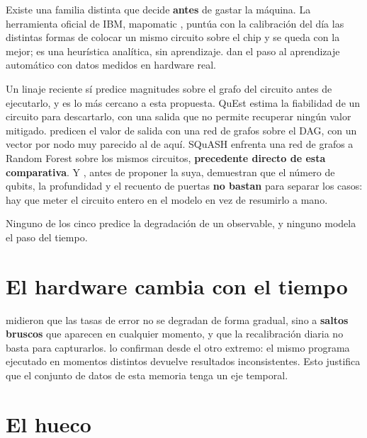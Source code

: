 Existe una familia distinta que decide \textbf{antes} de gastar la máquina. La herramienta
oficial de IBM, mapomatic \cite{nation2023suppressing}, puntúa con la calibración del día las
distintas formas de colocar un mismo circuito sobre el chip y se queda con la mejor; es una
heurística analítica, sin aprendizaje.  dan el paso al aprendizaje
automático con datos medidos en hardware real.

Un linaje reciente sí predice magnitudes sobre el grafo del circuito antes de ejecutarlo, y es
lo más cercano a esta propuesta. QuEst \cite{wang2025quest} estima la fiabilidad
de un circuito para descartarlo, con una salida que no permite recuperar ningún valor mitigado.
 predicen el valor de salida con una red de grafos sobre el DAG, con un
vector por nodo muy parecido al de aquí. 
SQuASH \cite{martyniuk2025benchmarking} enfrenta una red de grafos a Random Forest sobre los
mismos circuitos, \textbf{precedente directo de esta comparativa}. Y , antes de
proponer la suya, demuestran que el número de qubits, la profundidad y el recuento de puertas
\textbf{no bastan} para separar los casos: hay que meter el circuito entero en el modelo en vez
de resumirlo a mano.

Ninguno de los cinco predice la degradación de un observable, y ninguno modela el
paso del tiempo.

\section{El hardware cambia con el tiempo}
\label{sec:drift}

 midieron que las tasas de error no se degradan de forma gradual,
sino a \textbf{saltos bruscos} que aparecen en cualquier momento, y que la recalibración diaria
no basta para capturarlos.  lo confirman desde el otro extremo: el mismo
programa ejecutado en momentos distintos devuelve resultados inconsistentes. Esto 
justifica que el conjunto de datos de esta memoria tenga un eje temporal. 

\section{El hueco}
\label{sec:gap}

